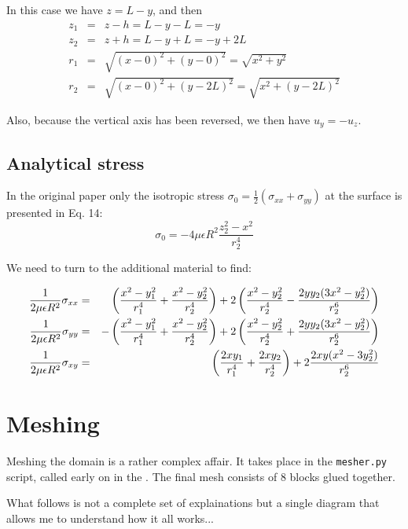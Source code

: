 In this case we have $z=L-y$, and then 
\begin{eqnarray}
z_1&=&z-h=L-y-L=-y  \\
z_2&=&z+h=L-y+L=-y+2L \\
r_1&=& \sqrt{(x-0)^2+(y-0)^2} = \sqrt{x^2+y^2}   \\
r_2&=& \sqrt{(x-0)^2+(y-2L)^2} = \sqrt{x^2+(y-2L)^2}
\end{eqnarray}

Also, because the vertical axis has been reversed, we then have $u_y=-u_z$.


\subsection*{Analytical stress}

In the original paper only the isotropic stress $\sigma_0=\frac12(\sigma_{xx}+\sigma_{yy})$
at the surface is presented in Eq. 14:
\[
\sigma_0 = -4 \mu \epsilon R^2 \frac{z_2^2-x^2}{r_2^4}
\]

We need to turn to the additional material to find:

\begin{eqnarray}
\frac{1}{2\mu\epsilon R^2} \sigma_{xx}&=& 
\left( \frac{x^2-y_1^2}{r_1^4}+\frac{x^2-y_2^2}{r_2^4} \right) 
+2 \left( \frac{x^2-y_2^2}{r_2^4}-\frac{2yy_2(3x^2-y_2^2)}{r_2^6}  \right)
\nonumber\\
\frac{1}{2\mu\epsilon R^2} \sigma_{yy}&=& 
- \left(  \frac{x^2-y_1^2}{r_1^4}+\frac{x^2-y_2^2}{r_2^4}    \right) 
+2\left( \frac{x^2-y_2^2}{r_2^4}+\frac{2yy_2(3x^2-y_2^2)}{r_2^6}  \right)
\nonumber\\
\frac{1}{2\mu\epsilon R^2} \sigma_{xy} &=& 
 \left( \frac{2xy_1}{r_1^4}+\frac{2xy_2}{r_2^4}  \right)
+2 \frac{2xy(x^2-3y_2^2)}{r_2^6}
\nonumber
\end{eqnarray}




\newpage
\section*{Meshing}

Meshing the domain is a rather complex affair. It takes place in the {\tt mesher.py} script,
called early on in the \stone. The final mesh consists of 8 blocks glued together.

What follows is not a complete set of explainations but a single diagram that 
allows me to understand how it all works...

